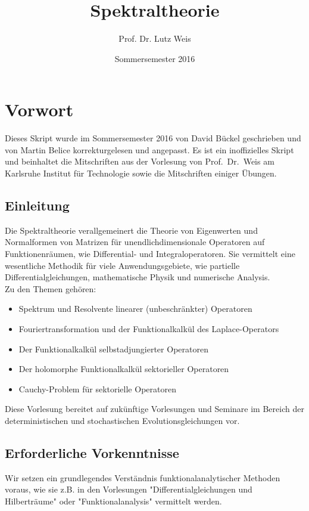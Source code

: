 \documentclass[11pt,a4paper,titlepage, ngerman]{scrartcl}
\title{Spektraltheorie}
\author{Prof. Dr. Lutz Weis}
\date{Sommersemester 2016}
\numberwithin{equation}{section}
\begin{document}
	\maketitle
	

	\section*{Vorwort}
	Dieses Skript wurde im Sommersemester 2016 von David Bückel geschrieben und von Martin Belice korrekturgelesen und angepasst. Es ist ein inoffizielles Skript und beinhaltet die Mitschriften aus der Vorlesung von Prof.~Dr.~Weis am Karlsruhe Institut für Technologie sowie die Mitschriften einiger Übungen.

	\thispagestyle{empty}

	\subsection*{Einleitung}

	Die Spektraltheorie verallgemeinert die Theorie von Eigenwerten und Normalformen von Matrizen für unendlichdimensionale Operatoren auf Funktionenräumen, wie Differential- und Integraloperatoren. Sie vermittelt eine wesentliche Methodik für viele Anwendungsgebiete, wie partielle Differentialgleichungen, mathematische Physik und numerische Analysis. \\

	Zu den Themen gehören:

  	\begin{itemize}
    	\item Spektrum und Resolvente linearer (unbeschränkter) Operatoren
    	\item Fouriertransformation und der Funktionalkalkül des Laplace-Operators
    	\item Der Funktionalkalkül selbstadjungierter Operatoren
    	\item Der holomorphe Funktionalkalkül sektorieller Operatoren
    	\item Cauchy-Problem für sektorielle Operatoren
 	\end{itemize}
  
	Diese Vorlesung bereitet auf zukünftige Vorlesungen und Seminare im Bereich der deterministischen und stochastischen Evolutionsgleichungen vor.

	\subsection*{Erforderliche Vorkenntnisse}
	Wir setzen ein grundlegendes Verständnis funktionalanalytischer Methoden voraus, wie sie z.B. in den Vorlesungen "Differentialgleichungen und Hilberträume" oder "Funktionalanalysis" vermittelt werden.
	
\end{document}
